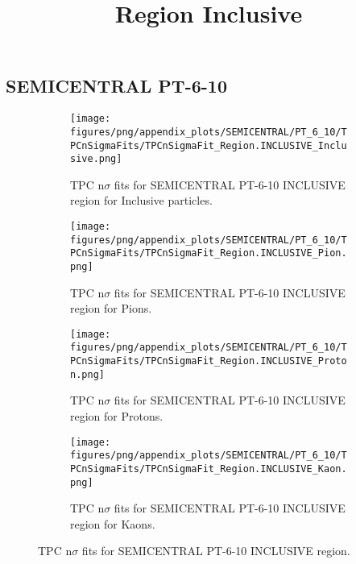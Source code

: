             \subsection{SEMICENTRAL PT-6-10}
            \begin{figure}[H]
                \title{Region Inclusive}
                \begin{subfigure}[b]{0.5\textwidth}
                    \centering
                    \texttt{[image: figures/png/appendix\_plots/SEMICENTRAL/PT\_6\_10/TPCnSigmaFits/TPCnSigmaFit\_Region.INCLUSIVE\_Inclusive.png]}
                    \caption{TPC n$\sigma$ fits for SEMICENTRAL PT-6-10 INCLUSIVE region for Inclusive particles.}
                    \label{fig:appendix_SEMICENTRAL_PT-6-10_INCLUSIVE_Inclusive}
                \end{subfigure}
                \begin{subfigure}[b]{0.5\textwidth}
                    \centering
                    \texttt{[image: figures/png/appendix\_plots/SEMICENTRAL/PT\_6\_10/TPCnSigmaFits/TPCnSigmaFit\_Region.INCLUSIVE\_Pion.png]}
                    \caption{TPC n$\sigma$ fits for SEMICENTRAL PT-6-10 INCLUSIVE region for Pions.}
                    \label{fig:appendix_SEMICENTRAL_PT-6-10_INCLUSIVE_Pion}
                \end{subfigure}
                \begin{subfigure}[b]{0.5\textwidth}
                    \centering
                    \texttt{[image: figures/png/appendix\_plots/SEMICENTRAL/PT\_6\_10/TPCnSigmaFits/TPCnSigmaFit\_Region.INCLUSIVE\_Proton.png]}
                    \caption{TPC n$\sigma$ fits for SEMICENTRAL PT-6-10 INCLUSIVE region for Protons.}
                    \label{fig:appendix_SEMICENTRAL_PT-6-10_INCLUSIVE_Proton}
                \end{subfigure}
                \begin{subfigure}[b]{0.5\textwidth}
                    \centering
                    \texttt{[image: figures/png/appendix\_plots/SEMICENTRAL/PT\_6\_10/TPCnSigmaFits/TPCnSigmaFit\_Region.INCLUSIVE\_Kaon.png]}
                    \caption{TPC n$\sigma$ fits for SEMICENTRAL PT-6-10 INCLUSIVE region for Kaons.}
                    \label{fig:appendix_SEMICENTRAL_PT-6-10_INCLUSIVE_Kaon}
                \end{subfigure}
                \caption{TPC n$\sigma$ fits for SEMICENTRAL PT-6-10 INCLUSIVE region.}
                \label{fig:appendix_SEMICENTRAL_PT-6-10_INCLUSIVE}
            \end{figure}
